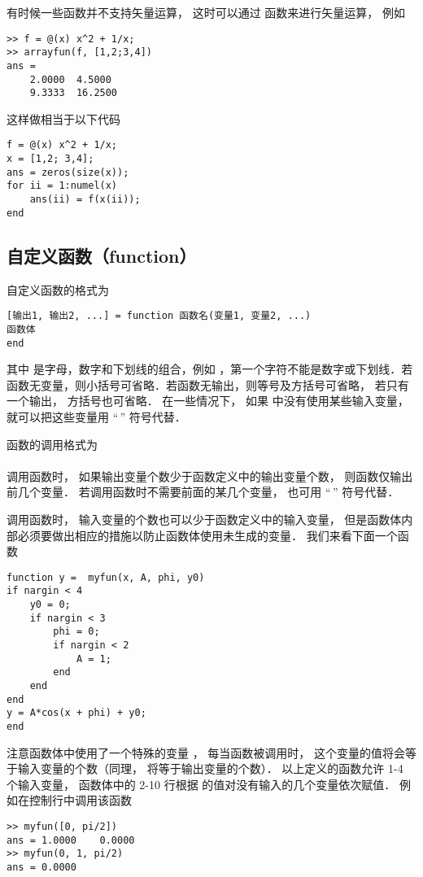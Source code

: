 有时候一些函数并不支持矢量运算， 这时可以通过  函数来进行矢量运算， 例如
\begin{lstlisting}[language=MatlabCom]
>> f = @(x) x^2 + 1/x;
>> arrayfun(f, [1,2;3,4])
ans =
    2.0000  4.5000
    9.3333  16.2500
\end{lstlisting}
这样做相当于以下代码

\begin{lstlisting}[language=MyMatlab]
f = @(x) x^2 + 1/x;
x = [1,2; 3,4];
ans = zeros(size(x));
for ii = 1:numel(x)
    ans(ii) = f(x(ii));
end
\end{lstlisting}

\subsection{自定义函数（function）}
自定义函数的格式为
\begin{lstlisting}[language=MatlabCom]
[输出1, 输出2, ...] = function 函数名(变量1, 变量2, ...)
函数体
end
\end{lstlisting}

其中  是字母，数字和下划线的组合，例如 ，第一个字符不能是数字或下划线．若函数无变量，则小括号可省略．若函数无输出，则等号及方括号可省略， 若只有一个输出， 方括号也可省略． 在一些情况下， 如果  中没有使用某些输入变量， 就可以把这些变量用 “\;\,\x{\~}” 符号代替．

函数的调用格式为\\
\\
调用函数时， 如果输出变量个数少于函数定义中的输出变量个数， 则函数仅输出前几个变量． 若调用函数时不需要前面的某几个变量， 也可用 “\;\,\x{\~}” 符号代替．

调用函数时， 输入变量的个数也可以少于函数定义中的输入变量， 但是函数体内部必须要做出相应的措施以防止函数体使用未生成的变量． 我们来看下面一个函数

\begin{lstlisting}[language=MyMatlab]
function y =  myfun(x, A, phi, y0)
if nargin < 4
    y0 = 0;
    if nargin < 3
        phi = 0;
        if nargin < 2
            A = 1;
        end
    end
end
y = A*cos(x + phi) + y0;
end
\end{lstlisting}

注意函数体中使用了一个特殊的变量 ， 每当函数被调用时， 这个变量的值将会等于输入变量的个数（同理，  将等于输出变量的个数）． 以上定义的函数允许 1-4 个输入变量， 函数体中的 2-10 行根据  的值对没有输入的几个变量依次赋值． 例如在控制行中调用该函数
\begin{lstlisting}[language=MatlabCom]
>> myfun([0, pi/2])
ans = 1.0000    0.0000
>> myfun(0, 1, pi/2)
ans = 0.0000
\end{lstlisting}

